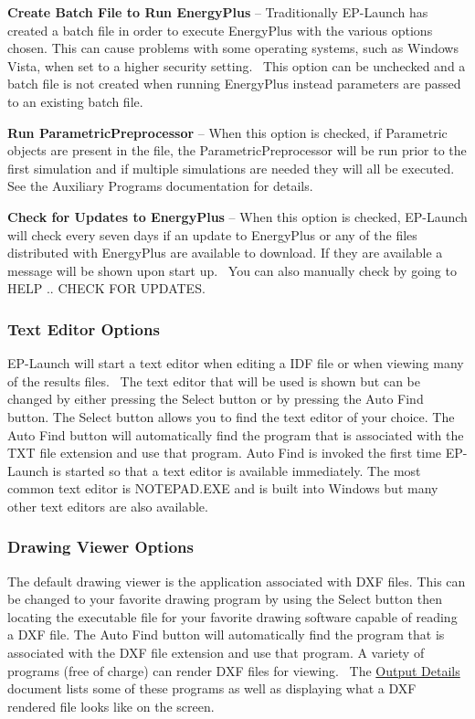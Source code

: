 \textbf{Create Batch File to Run EnergyPlus} -- Traditionally EP-Launch has created a batch file in order to execute EnergyPlus with the various options chosen. This can cause problems with some operating systems, such as Windows Vista, when set to a higher security setting.~ This option can be unchecked and a batch file is not created when running EnergyPlus instead parameters are passed to an existing batch file.

\textbf{Run ParametricPreprocessor} -- When this option is checked, if Parametric objects are present in the file, the ParametricPreprocessor will be run prior to the first simulation and if multiple simulations are needed they will all be executed. See the Auxiliary Programs documentation for details.

\textbf{Check for Updates to EnergyPlus} -- When this option is checked, EP-Launch will check every seven days if an update to EnergyPlus or any of the files distributed with EnergyPlus are available to download. If they are available a message will be shown upon start up.~ You can also manually check by going to HELP .. CHECK FOR UPDATES.

\subsubsection{Text Editor Options}\label{text-editor-options}

EP-Launch will start a text editor when editing a IDF file or when viewing many of the results files.~ The text editor that will be used is shown but can be changed by either pressing the Select button or by pressing the Auto Find button. The Select button allows you to find the text editor of your choice. The Auto Find button will automatically find the program that is associated with the TXT file extension and use that program. Auto Find is invoked the first time EP-Launch is started so that a text editor is available immediately. The most common text editor is NOTEPAD.EXE and is built into Windows but many other text editors are also available.

\subsubsection{Drawing Viewer Options}\label{drawing-viewer-options}

The default drawing viewer is the application associated with DXF files. This can be changed to your favorite drawing program by using the Select button then locating the executable file for your favorite drawing software capable of reading a DXF file. The Auto Find button will automatically find the program that is associated with the DXF file extension and use that program. A variety of programs (free of charge) can render DXF files for viewing.~ The \href{OutputDetailsAndExamples.pdf}{Output Details} document lists some of these programs as well as displaying what a DXF rendered file looks like on the screen.

